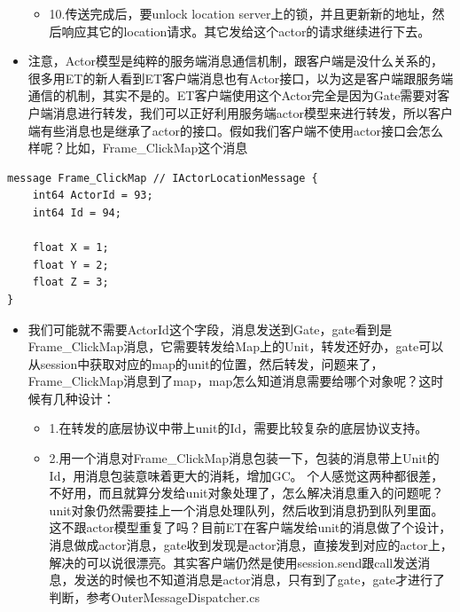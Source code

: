 \documentclass[9pt, b5paper]{article}
\begin{document}
\begin{itemize}
\begin{itemize}
\item 10.传送完成后，要unlock location server上的锁，并且更新新的地址，然后响应其它的location请求。其它发给这个actor的请求继续进行下去。
\end{itemize}
\item 注意，Actor模型是纯粹的服务端消息通信机制，跟客户端是没什么关系的，很多用ET的新人看到ET客户端消息也有Actor接口，以为这是客户端跟服务端通信的机制，其实不是的。ET客户端使用这个Actor完全是因为Gate需要对客户端消息进行转发，我们可以正好利用服务端actor模型来进行转发，所以客户端有些消息也是继承了actor的接口。假如我们客户端不使用actor接口会怎么样呢？比如，Frame\_ClickMap这个消息
\end{itemize}
\begin{verbatim}
message Frame_ClickMap // IActorLocationMessage {
	int64 ActorId = 93;
	int64 Id = 94;

	float X = 1;
	float Y = 2;
	float Z = 3;
}
\end{verbatim}
\begin{itemize}
\item 我们可能就不需要ActorId这个字段，消息发送到Gate，gate看到是Frame\_ClickMap消息，它需要转发给Map上的Unit，转发还好办，gate可以从session中获取对应的map的unit的位置，然后转发，问题来了，Frame\_ClickMap消息到了map，map怎么知道消息需要给哪个对象呢？这时候有几种设计：
\begin{itemize}
\item 1.在转发的底层协议中带上unit的Id，需要比较复杂的底层协议支持。
\item 2.用一个消息对Frame\_ClickMap消息包装一下，包装的消息带上Unit的Id，用消息包装意味着更大的消耗，增加GC。 个人感觉这两种都很差，不好用，而且就算分发给unit对象处理了，怎么解决消息重入的问题呢？unit对象仍然需要挂上一个消息处理队列，然后收到消息扔到队列里面。这不跟actor模型重复了吗？目前ET在客户端发给unit的消息做了个设计，消息做成actor消息，gate收到发现是actor消息，直接发到对应的actor上，解决的可以说很漂亮。其实客户端仍然是使用session.send跟call发送消息，发送的时候也不知道消息是actor消息，只有到了gate，gate才进行了判断，参考OuterMessageDispatcher.cs
\end{itemize}
\end{itemize}
\end{document}
